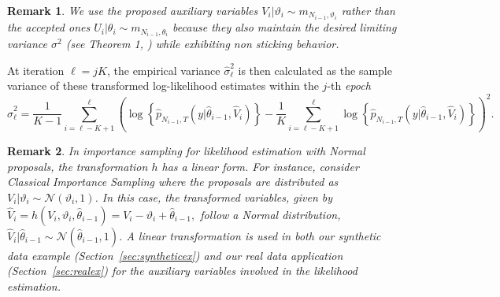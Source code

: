 \documentclass[pdflatex,sn-mathphys-num]{sn-jnl}
\theoremstyle{thmstyleone}
\theoremstyle{thmstyletwo}
\newtheorem{remark}{Remark}
\theoremstyle{thmstylethree}
\begin{document}
\begin{remark}
We use the proposed auxiliary variables $V_i|\vartheta_i \sim m_{N_{i-1},\vartheta_i}$ rather than the accepted ones $U_i|\theta_i \sim m_{N_{i-1},\theta_i}$ because they also maintain the desired limiting variance $\sigma^2$ (see Theorem 1, \cite{schmon_large-sample_2021}) while exhibiting non sticking behavior.
\end{remark}

 At iteration $\ell=jK$, the empirical variance $\hat{\sigma}_\ell^2$ is then calculated as the sample variance of these transformed log-likelihood estimates within the $j$-th \textit{epoch} 
{\small
 \begin{equation}
    \hat{\sigma}_\ell^2 = \frac{1}{K-1} \sum_{i = \ell-K+1}^{\ell} \left( \log \left\{\widehat{p}_{N_{i-1},T}(y | \hat{\theta}_{i-1}, \widehat{V}_i)\right\} - \frac{1}{K} \sum_{i = \ell-K+1}^{\ell} \log \left\{\widehat{p}_{N_{i-1},T}(y |\hat{\theta}_{i-1}, \widehat{V}_i)\right\} \right)^2.
    \label{hatsigma}
    \end{equation}
}

\begin{remark}
In importance sampling for likelihood estimation with Normal proposals, 
the transformation \( h \) has a linear form. 
For instance, consider Classical Importance Sampling where the proposals are distributed as \( V_i | \vartheta_i \sim \mathcal{N}(\vartheta_i, 1) \). 
In this case, the transformed variables, given by \(
\widehat{V}_i = h(V_i, \vartheta_i, \hat{\theta}_{i-1}) = V_i - \vartheta_i + \hat{\theta}_{i-1},
\) follow a Normal distribution, \( \widehat{V}_i|\hat{\theta}_{i-1} \sim \mathcal{N}(\hat{\theta}_{i-1}, 1) \). 
A linear transformation is used in both our synthetic data example (Section~\ref{sec:syntheticex}) and our real data application (Section~\ref{sec:realex}) for the auxiliary variables involved in the likelihood estimation.
\end{remark}
\end{document}
